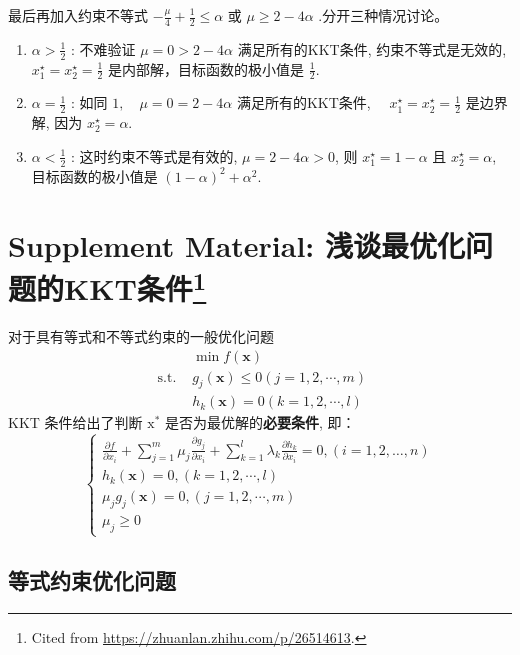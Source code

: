 最后再加入约束不等式 $ -\frac{\mu}{4}+\frac{1}{2} \leq \alpha $ 或 $ \mu \geq 2-4 \alpha $ .分开三种情况讨论。

\begin{enumerate}
    \item $ \alpha>\frac{1}{2} $ : 不难验证 $ \mu=0>2-4 \alpha $ 满足所有的KKT条件, 约束不等式是无效的, $ x_{1}^{\star}=x_{2}^{\star}=\frac{1}{2} $ 是内部解，目标函数的极小值是 $ \frac{1}{2}$.
    \item $ \alpha=\frac{1}{2} $ : 如同 $ 1, \quad \mu=0=2-4 \alpha $ 满足所有的KKT条件, $ \quad x_{1}^{\star}=x_{2}^{\star}=\frac{1}{2} $ 是边界解, 因为 $ x_{2}^{\star}=\alpha $.
    \item $ \alpha<\frac{1}{2} $ : 这时约束不等式是有效的, $ \mu=2-4 \alpha>0 $, 则 $ x_{1}^{\star}=1-\alpha $ 且 $ x_{2}^{\star}=\alpha $, 目标函数的极小值是 $ (1-\alpha)^{2}+\alpha^{2} $.
\end{enumerate}

\section[Supplement Material: 浅谈最优化问题的KKT条件]{Supplement Material: 浅谈最优化问题的KKT条件\footnote{Cited from \url{https://zhuanlan.zhihu.com/p/26514613}.}}


\begin{theorem}[KKT条件]
    对于具有等式和不等式约束的一般优化问题
$$
\begin{aligned}
&\min f(\mathbf{x}) \\
\text { s.t. }& g_{j}(\mathbf{x}) \leq 0(j=1,2, \cdots, m) \\
&h_{k}(\mathbf{x})=0(k=1,2, \cdots, l)
\end{aligned}
$$
KKT 条件给出了判断 $ \mathrm{x}^{*} $ 是否为最优解的\textbf{必要条件}, 即：
$$
\left\{\begin{array}{l}
\frac{\partial f}{\partial x_{i}}+\sum_{j=1}^{m} \mu_{j} \frac{\partial g_{j}}{\partial x_{i}}+\sum_{k=1}^{l} \lambda_{k} \frac{\partial h_{k}}{\partial x_{i}}=0,(i=1,2, \ldots, n) \\
h_{k}(\mathbf{x})=0,(k=1,2, \cdots, l) \\
\mu_{j} g_{j}(\mathbf{x})=0,(j=1,2, \cdots, m) \\
\mu_{j} \geq 0
\end{array}\right.
$$
\end{theorem}


\subsection{等式约束优化问题}

